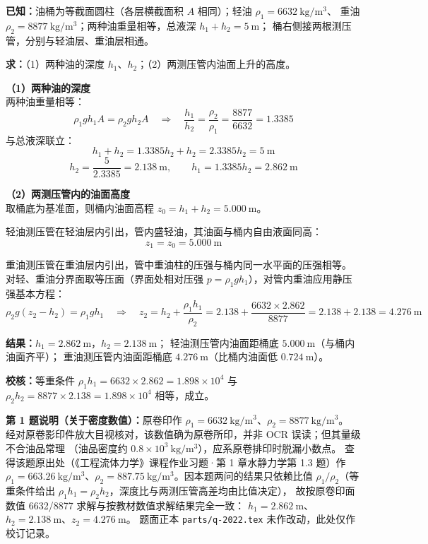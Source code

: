 \begin{jie}
\textbf{已知：}油桶为等截面圆柱（各层横截面积 $A$ 相同）；轻油 $\rho_1=6632\ \mathrm{kg/m^3}$、
重油 $\rho_2=8877\ \mathrm{kg/m^3}$；两种油重量相等，总液深 $h_1+h_2=5\ \mathrm{m}$；
桶右侧接两根测压管，分别与轻油层、重油层相通。

\textbf{求：}（1）两种油的深度 $h_1$、$h_2$；（2）两测压管内油面上升的高度。

\textbf{（1）两种油的深度}\\
两种油重量相等：
\[
\rho_1gh_1A=\rho_2gh_2A\quad\Longrightarrow\quad \frac{h_1}{h_2}=\frac{\rho_2}{\rho_1}=\frac{8877}{6632}=1.3385
\]
与总液深联立：
\[
h_1+h_2=1.3385h_2+h_2=2.3385h_2=5\ \mathrm{m}
\]
\[
h_2=\frac{5}{2.3385}=2.138\ \mathrm{m},\qquad h_1=1.3385h_2=2.862\ \mathrm{m}
\]

\textbf{（2）两测压管内的油面高度}\\
取桶底为基准面，则桶内油面高程 $z_0=h_1+h_2=5.000\ \mathrm{m}$。

轻油测压管在轻油层内引出，管内盛轻油，其油面与桶内自由液面同高：
\[
z_1=z_0=5.000\ \mathrm{m}
\]

重油测压管在重油层内引出，管中重油柱的压强与桶内同一水平面的压强相等。
对轻、重油分界面取等压面（界面处相对压强 $p=\rho_1gh_1$），对管内重油应用静压强基本方程：
\[
\rho_2g(z_2-h_2)=\rho_1gh_1\quad\Longrightarrow\quad z_2=h_2+\frac{\rho_1h_1}{\rho_2}
=2.138+\frac{6632\times2.862}{8877}=2.138+2.138=4.276\ \mathrm{m}
\]

\textbf{结果：}$h_1=2.862\ \mathrm{m}$，$h_2=2.138\ \mathrm{m}$；
轻油测压管内油面距桶底 $5.000\ \mathrm{m}$（与桶内油面齐平）；
重油测压管内油面距桶底 $4.276\ \mathrm{m}$（比桶内油面低 $0.724\ \mathrm{m}$）。

\textbf{校核：}等重条件 $\rho_1h_1=6632\times2.862=1.898\times10^{4}$ 与
$\rho_2h_2=8877\times2.138=1.898\times10^{4}$ 相等，成立。
\end{jie}

\begin{tishi}
\textbf{第 1 题说明（关于密度数值）：}原卷印作 $\rho_1=6632\ \mathrm{kg/m^3}$、$\rho_2=8877\ \mathrm{kg/m^3}$。
经对原卷影印件放大目视核对，该数值确为原卷所印，并非 OCR 误读；但其量级不合油品常理
（油品密度约 $0.8\times10^{3}\ \mathrm{kg/m^3}$），应系原卷排印时脱漏小数点。
查得该题原出处（《工程流体力学》课程作业习题·第 1 章水静力学第 1.3 题）作
$\rho_1=663.26\ \mathrm{kg/m^3}$、$\rho_2=887.75\ \mathrm{kg/m^3}$。因本题两问的结果只依赖比值
$\rho_1/\rho_2$（等重条件给出 $\rho_1h_1=\rho_2h_2$，深度比与两测压管高差均由比值决定），
故按原卷印面数值 6632/8877 求解与按教材数值求解结果完全一致：
$h_1=2.862\ \mathrm{m}$、$h_2=2.138\ \mathrm{m}$、$z_2=4.276\ \mathrm{m}$。
题面正本 \texttt{parts/q-2022.tex} 未作改动，此处仅作校订记录。
\end{tishi}

